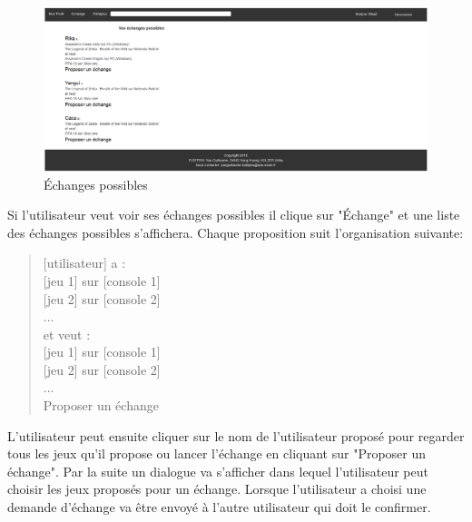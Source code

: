 \documentclass[a4paper,12pt,abstracton,titlepage]{scrartcl}
\begin{document}
\vspace{1cm}
\begin{figure}[h]
  \centering
    \includegraphics[width=\textwidth]{./doc/04_echanges.png}
	\caption{Échanges possibles}
	\label{exch}
\end{figure}

Si l'utilisateur veut voir ses échanges possibles il clique sur "Échange" et une liste des échanges possibles s'affichera. Chaque proposition suit l'organisation suivante:\\

\begin{quote}
{[utilisateur]} a :\\
{[jeu 1]} sur {[console 1]}\\
{[jeu 2]} sur {[console 2]}\\
...\\
et veut :\\
{[jeu 1]} sur {[console 1]}\\
{[jeu 2]} sur {[console 2]}\\
...\\
Proposer un échange\\
\end{quote}

L'utilisateur peut ensuite cliquer sur le nom de l'utilisateur proposé pour regarder tous les jeux qu'il propose ou lancer l'échange en cliquant sur "Proposer un échange". Par la suite un dialogue va s'afficher dans lequel l'utilisateur peut choisir les jeux proposés pour un échange. Lorsque l'utilisateur a choisi une demande d'échange va être envoyé à l'autre utilisateur qui doit le confirmer.

\newpage
\end{document}

